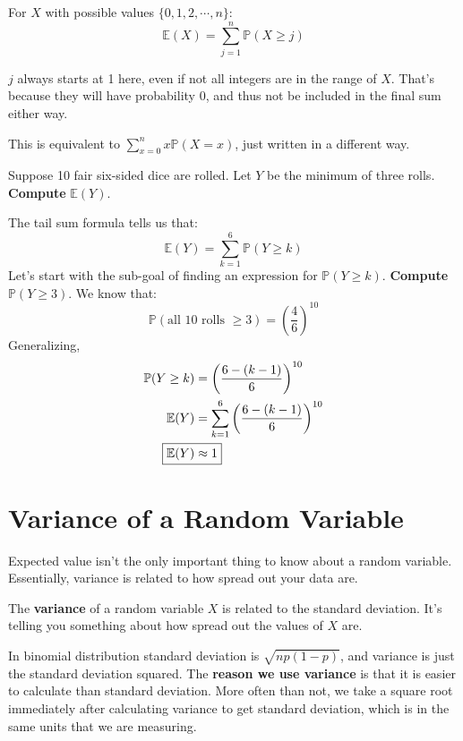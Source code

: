 \documentclass[titlepage, 12pt, leqno]{article}
\begin{document}
For $X$ with possible values $\{0,1,2, \cdots ,n\}$:
\[
    \mathbb{E}(X) = \sum_{j=1}^{n}\mathbb{P}(X \ge j)
\]
\begin{note}
    $j$ always starts at 1 here, even if not all integers are in the range of $X$.
    That's because they will have probability 0, and thus not be included in the
    final sum either way.
\end{note}
This is equivalent to $\sum_{x=0}^{n}x \mathbb{P}(X=x)$, just written in a 
different way.

\begin{ex}
    Suppose 10 fair six-sided dice are rolled. Let $Y$ be the minimum of three 
    rolls. \textbf{Compute} $ \mathbb{E}(Y)$.

    \vspace{10px}
    The tail sum formula tells us that:
    \[
    \mathbb{E}(Y) = \sum_{k=1}^{6}\mathbb{P}(Y\ge k)
    \]
    Let's start with the sub-goal of finding an expression for $ \mathbb{P}(Y
    \ge k)$. \textbf{Compute} $ \mathbb{P}(Y \ge 3)$.
    \vspace{10px}
    We know that:
    \[
        \mathbb{P}( \text{all 10 rolls }\ge 3) = \left(\frac{4}{6}\right)^{10}
    \]
    Generalizing,
   \begin{align*}
       \mathbb{P}(Y \ge k) &= \left(\frac{6-(k-1)}{6}\right)^{10} \\
       \mathbb{E}(Y) &= \sum_{k=1}^{6}\left(\frac{6-(k-1)}{6}\right)^{10} \\
       \Aboxed{ \mathbb{E}(Y) &\approx 1} 
   \end{align*}
\end{ex}

\pagebreak
\section{Variance of a Random Variable}
Expected value isn't the only important thing to know about a random variable.
Essentially, variance is related to how spread out your data are.

\begin{definition}
    The \textbf{variance} of a random variable $X$ is related to the standard
    deviation. It's telling you something about how spread out the values of $X$
    are.
\end{definition}

In binomial distribution standard deviation is $\sqrt{np(1-p)}$, and variance is
just the standard deviation squared. The \textbf{reason we use variance} is that
it is easier to calculate than standard deviation. More often than not, we take a
square root immediately after calculating variance to get standard deviation, 
which is in the same units that we are measuring.
\end{document}
